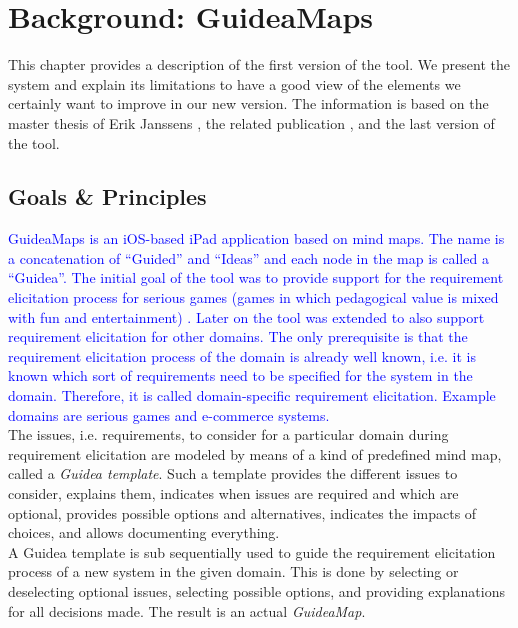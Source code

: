 \chapter{Background: GuideaMaps}\label{ch:background-guideamaps}
This chapter provides a description of the first version of the tool. We present the system and explain its limitations to have a good view of the elements we certainly want to improve in our new version. The information is based on the master thesis of Erik Janssens \citep{erikjanssens}, the related publication \citep{detroyerjanssens}, and the last version of the tool.

\section{Goals \& Principles}
\textcolor{blue}{
GuideaMaps is an iOS-based iPad application based on mind maps. The name is a concatenation of ``Guided'' and ``Ideas'' and each node in the map is called a ``Guidea''. The initial goal of the tool was to provide support for the requirement elicitation process for serious games (games in which pedagogical value is mixed with fun and entertainment) \citep{erikjanssens}. Later on the tool was extended to also support requirement elicitation for other domains. The only prerequisite is that the requirement elicitation process of the domain is already well known, i.e. it is known which sort of requirements need to be specified for the system in the domain. Therefore, it is called domain-specific requirement elicitation. Example domains are serious games and e-commerce systems.
}\\

The issues, i.e. requirements, to consider for a particular domain during requirement elicitation are modeled by means of a kind of predefined mind map, called a \textit{Guidea template}. Such a template provides the different issues to consider, explains them, indicates when issues are required and which are optional, provides possible options and alternatives, indicates the impacts of choices, and allows documenting everything.\\

A Guidea template is sub sequentially used to guide the requirement elicitation process of a new system in the given domain. This is done by selecting or deselecting optional issues, selecting possible options, and providing explanations for all decisions made. The result is an actual \textit{GuideaMap}.\\

